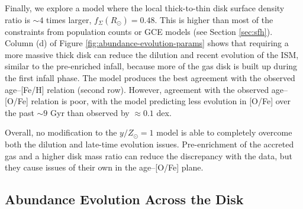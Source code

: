 \documentclass[twocolumn,twocolappendix,linenumbers]{aastex631}
\newcommand{\yZ}[1]{$y/Z_\odot=#1$}
\begin{document}
Finally, we explore a model where the local thick-to-thin disk surface density ratio is $\sim4$ times larger, $f_\Sigma(R_\odot)=0.48$. This is higher than most of the constraints from population counts or GCE models (see Section \ref{sec:sfh}). Column (d) of Figure \ref{fig:abundance-evolution-params} shows that requiring a more massive thick disk can reduce the dilution and recent evolution of the ISM, similar to the pre-enriched infall, because more of the gas disk is built up during the first infall phase. The model produces the best agreement with the observed age--[Fe/H] relation (second row). However, agreement with the observed age--[O/Fe] relation is poor, with the model predicting less evolution in [O/Fe] over the past $\sim9$ Gyr than observed by $\approx0.1$ dex.

Overall, no modification to the \yZ{1} model is able to completely overcome both the dilution and late-time evolution issues. Pre-enrichment of the accreted gas and a higher disk mass ratio can reduce the discrepancy with the data, but they cause issues of their own in the age--[O/Fe] plane. 

\subsection{Abundance Evolution Across the Disk}
\label{sec:disk-evolution}
\end{document}
